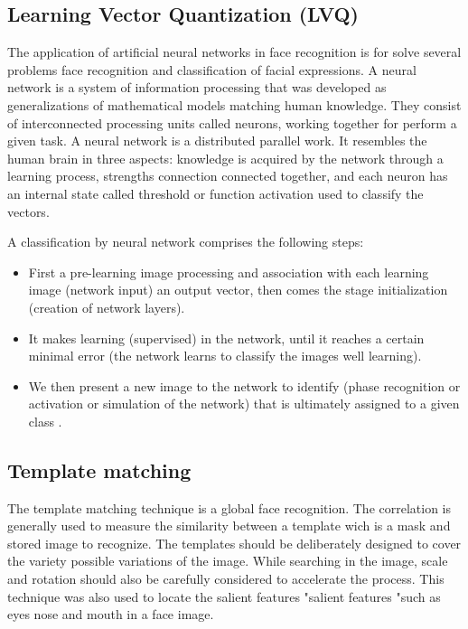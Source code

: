 \subsection{Learning Vector Quantization (LVQ)}
The application of artificial neural networks in face recognition is for solve several problems face recognition and
classification of facial expressions.
A neural network is a system of information processing that was developed
as generalizations of mathematical models matching human knowledge. They
consist of interconnected processing units called neurons,
working together for perform a given task.
A neural network is a distributed parallel work. It resembles the human brain in three
aspects: knowledge is acquired by the network through a learning process, strengths
connection connected together, and each neuron has an internal state called threshold or function
activation used to classify the vectors.

A classification by neural network comprises the following steps:
\begin{itemize}
\item First a pre-learning image processing and association with each learning image (network input) an output vector, then comes the stage initialization (creation of network layers). 
\item It makes learning (supervised) in the network,
until it reaches a certain minimal error (the network learns to classify the images well
learning). 
\item We then present a new image to the network to identify (phase
recognition or activation or simulation of the network) that is ultimately assigned to a
given class . 
\end{itemize}

\subsection{Template matching}
The template matching technique is a global face recognition. The correlation
is generally used to measure the similarity between a template wich is a mask and stored
image to recognize. The templates should be deliberately designed to cover the variety
possible variations of the image.
While searching in the image, scale and rotation should also be
carefully considered to accelerate the process.
This technique was also used to locate the salient features "salient
features "such as eyes nose and mouth in a face image.

